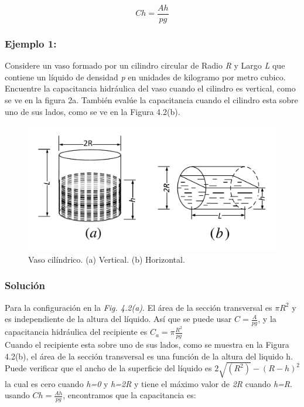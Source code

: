 \documentclass[a4paper,12pt,twoside]{proyectotanquesecci}
\begin{document}
\begin{equation}
C{h}=\frac{A{h}}{pg}
\label{Ecu 5}
\end{equation}

\subsubsection{Ejemplo 1:}

Considere un vaso formado por un cilindro circular de Radio \textit{R} y Largo \textit{L} que contiene un líquido de densidad \textit{p} en unidades de kilogramo por metro cubico. Encuentre la capacitancia hidráulica del vaso cuando el cilindro es vertical, como se ve en la figura 2a. También evalúe la capacitancia cuando el cilindro esta sobre uno de sus lados, como se ve en la Figura 4.2(b).

\begin{figure}[h]
\centering
\includegraphics[scale=0.4]{Figura2}
\renewcommand{\figurename}{Fig.}
\caption{Vaso cilíndrico. (a) Vertical. (b) Horizontal.}
\label{Vaso cilíndrico. (a) Cilindro vertical. (b) Cilindro horizontal.}
\end{figure}

\subsubsection{Solución}

Para la configuración en la \textit{Fig. 4.2(a)}. El área de la sección transversal es ${\pi R^{2}}$ y es independiente de la altura del líquido. Así que se puede usar $C=\frac{A}{pg}$, y la capacitancia hidráulica del recipiente es $C_{a}=\pi\frac{R^{2}}{pg}$ \\

Cuando el recipiente esta sobre uno de sus lados, como se muestra en la Figura 4.2(b), el área de la sección transversal es una función de la altura del liquido h. Puede verificar que el ancho de la superficie del líquido es $2\sqrt{(R^{2})}-(R-h)^{2}$ la cual es cero cuando \textit{h=0} y \textit{h=2R} y tiene el máximo valor de \textit{2R} cuando \textit{h=R}. usando $C{h}=\frac{A{h}}{pg}$, encontramos que la capacitancia es:
\end{document}
